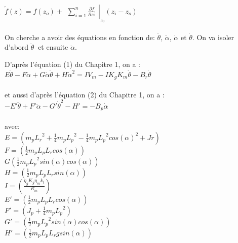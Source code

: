 \documentclass[12pt, a4paper, openany]{report}
\begin{document}
   $\tilde{f}(z)=f(z_{o})+\left.\begin{matrix}\sum_{i=1}^{n}\frac{\partial f }{\partial zi}\end{matrix}\right|_{z_0} (z_{i}-z_{o})$ \\\\ 
   
   On cherche a avoir des équations en fonction de:  $\ddot{\theta }$, $\ddot{\alpha}$, $\dot{\alpha}$ et $\dot{\theta}$. On va isoler d'abord $\ddot{\theta }\:$ et ensuite $\ddot{\alpha}$.

D'après l'équation (1) du Chapitre 1, on a : \\


    $E\ddot{\theta }-F\ddot{\alpha}+ G\dot{\alpha}\dot{\theta}+H\dot{\alpha}^2=IV_{m}-IK_{g}K_{m}\dot{\theta}-B_{r}\dot{\theta}$\\\\

et aussi d'après l'équation (2) du Chapitre 1, on a :\\ 


$-{E}'\ddot{\theta}+{F}'\ddot{\alpha}-{G}'\dot{\theta}^2-{H}'=-B_{p}\dot{\alpha}$ \\\\

avec: \\

$E=(m_{p}{L_{r}}^2+\frac{1}{4}m_{p}{L_{p}}^2-\frac{1}{4}m_{p}{L_{p}}^2cos({\alpha})^2+Jr)$ \\

$F=(\frac{1}{2}m_{p}L_{p}L_{r}cos(\alpha))$\\

$G(\frac{1}{2}m_{p}{L_{p}}^2sin(\alpha)cos(\alpha))$\\

$H=(\frac{1}{2}m_{p}L_{p}L_{r}sin(\alpha))$\\

$I=(\frac{\eta_{g}K_{g}\eta_{m}k_{t}}{R_{m}})$\\

${E}'=(\frac{1}{2}m_{p}L_{p}L_{r}cos(\alpha))$\\

${F}'=(J_{p}+\frac{1}{4}m_{p}{L_{p}}^2)$\\

${G}'=(\frac{1}{2}m_{p}{L_{p}}^2sin(\alpha)cos(\alpha))$\\

${H}'=(\frac{1}{2}m_{p}L_{p}L_{r}gsin(\alpha))$\\\\
\end{document}
